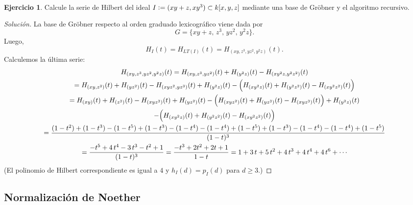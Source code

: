 \documentclass{article}
\theoremstyle{definition}
\newtheorem{ejerc}{Ejercicio}
\newenvironment{solucion}{\begin{proof}[Solución]}{\end{proof}}
\begin{document}
\begin{ejerc}
  Calcule la serie de Hilbert del ideal $I \mathrel{\mathop:}= (xy + z, xy^3) \subset k[x,y,z]$
  mediante una base de Gröbner y el algoritmo recursivo.

  \ifdefined\solutions\begin{solucion}
    La base de Gröbner respecto al orden graduado lexicográfico viene dada por
    $$G = \{ xy+z, \, z^3, \, yz^2, \, y^2z \}.$$
    Luego,
    $$H_I (t) = H_{LT (I)} (t) = H_{(xy, z^3, yz^2, y^2z)} (t).$$
    Calculemos la última serie:
    \begin{multline*}
      H_{(xy, z^3, yz^2, y^2z)} (t) =
      H_{(xy, z^3, yz^2)} (t) + H_{(y^2z)} (t) - H_{(xy^2z, y^2 z^2)} (t) \\
      = H_{(xy, z^3)} (t) + H_{(yz^2)} (t) - H_{(xyz^2, yz^3)} (t) + H_{(y^2z)} (t) - \Bigl(H_{(xy^2z)} (t) + H_{(y^2 z^2)} (t) - H_{(x y^2 z^2)} (t)\Bigr) \\
      = H_{(xy)} (t) + H_{(z^3)} (t) - H_{(xyz^3)} (t) + H_{(yz^2)} (t) - \Bigl(H_{(xyz^2)} (t) + H_{(yz^3)} (t) - H_{(xyz^3)} (t)\Bigr) + H_{(y^2z)} (t) \\
      - \Bigl(H_{(xy^2z)} (t) + H_{(y^2 z^2)} (t) - H_{(x y^2 z^2)} (t)\Bigr) \\
      = \frac{(1-t^2) + (1-t^3) - (1-t^5) + (1-t^3) - (1-t^4) - (1-t^4) + (1-t^5) + (1-t^3) - (1-t^4) - (1-t^4) + (1-t^5)}{(1-t)^3} \\
      = \frac{-t^5 + 4\,t^4 - 3\,t^3 - t^2 + 1}{(1-t)^3} =
      \frac{-t^3 + 2t^2 + 2t + 1}{1-t} =
      1 + 3\,t + 5\,t^2 + 4\,t^3 + 4\,t^4 + 4\,t^6 + \cdots
    \end{multline*}
    (El polinomio de Hilbert correspondiente es igual a $4$ y
    $h_I (d) = p_I (d)$ para $d \ge 3$.)
  \end{solucion}\fi
\end{ejerc}

\subsection*{Normalización de Noether}
\end{document}
